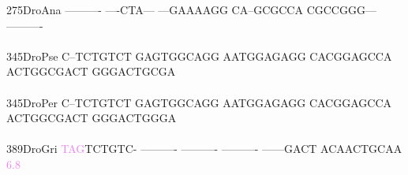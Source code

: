 \documentclass[11pt,twoside,reqno,a4paper]{article}
\begin{document}
{275\hspace*{1\charwidth}DroAna	----------	----CTA---	---GAAAAGG	CA--GCGCCA	CGCCGGG---	----------	\\
\hspace*{4\charwidth}\hspace*{7\charwidth}\hspace*{1\charwidth}\hspace*{1\charwidth}\hspace*{1\charwidth}\hspace*{1\charwidth}\hspace*{1\charwidth}\hspace*{1\charwidth}\\
345\hspace*{1\charwidth}DroPse	C--TCTGTCT	GAGTGGCAGG	AATGGAGAGG	CACGGAGCCA	ACTGGCGACT	GGGACTGCGA	\\
\hspace*{4\charwidth}\hspace*{7\charwidth}\hspace*{1\charwidth}\hspace*{1\charwidth}\hspace*{1\charwidth}\hspace*{1\charwidth}\hspace*{1\charwidth}\hspace*{1\charwidth}\\
345\hspace*{1\charwidth}DroPer	C--TCTGTCT	GAGTGGCAGG	AATGGAGAGG	CACGGAGCCA	ACTGGCGACT	GGGACTGGGA	\\
\hspace*{4\charwidth}\hspace*{7\charwidth}\hspace*{1\charwidth}\hspace*{1\charwidth}\hspace*{1\charwidth}\hspace*{1\charwidth}\hspace*{1\charwidth}\hspace*{1\charwidth}\\
389\hspace*{1\charwidth}DroGri	\textcolor{violet}{T}\textcolor{violet}{A}\textcolor{violet}{G}TCTGTC-	----------	----------	----------	------GACT	ACAACTGCAA	\\
\hspace*{4\charwidth}\hspace*{7\charwidth}\hspace*{0\charwidth}\textcolor{violet}{6.8}\hspace*{1\charwidth}\hspace*{1\charwidth}\hspace*{1\charwidth}\hspace*{1\charwidth}\hspace*{1\charwidth}\hspace*{1\charwidth}\\
}
\end{document}

